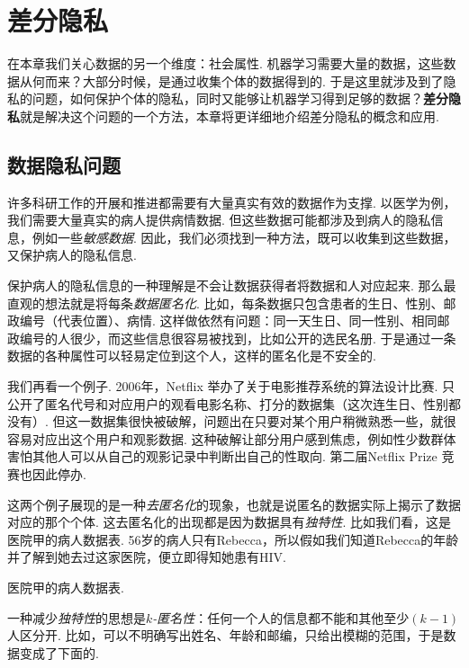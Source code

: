 \chapter{差分隐私}\label{chap:differential-privacy}

在本章我们关心数据的另一个维度：社会属性. 机器学习需要大量的数据，这些数据从何而来？大部分时候，是通过收集个体的数据得到的. 于是这里就涉及到了隐私的问题，如何保护个体的隐私，同时又能够让机器学习得到足够的数据？\textbf{差分隐私}就是解决这个问题的一个方法，本章将更详细地介绍差分隐私的概念和应用. 

\section{数据隐私问题}

许多科研工作的开展和推进都需要有大量真实有效的数据作为支撑. 以医学为例，我们需要大量真实的病人提供病情数据. 但这些数据可能都涉及到病人的隐私信息，例如一些\emph{敏感数据}. 因此，我们必须找到一种方法，既可以收集到这些数据，又保护病人的隐私信息.

保护病人的隐私信息的一种理解是不会让数据获得者将数据和人对应起来. 那么最直观的想法就是将每条\emph{数据匿名化}. 比如，每条数据只包含患者的生日、性别、邮政编号（代表位置）、病情. 这样做依然有问题：同一天生日、同一性别、相同邮政编号的人很少，而这些信息很容易被找到，比如公开的选民名册. 于是通过一条数据的各种属性可以轻易定位到这个人，这样的匿名化是不安全的.

我们再看一个例子. 2006年，Netflix 举办了关于电影推荐系统的算法设计比赛.
只公开了匿名代号和对应用户的观看电影名称、打分的数据集（这次连生日、性别都没有）. 但这一数据集很快被破解，问题出在只要对某个用户稍微熟悉一些，就很容易对应出这个用户和观影数据. 这种破解让部分用户感到焦虑，例如性少数群体害怕其他人可以从自己的观影记录中判断出自己的性取向. 第二届Netflix Prize 竞赛也因此停办.

这两个例子展现的是一种\emph{去匿名化}的现象，也就是说匿名的数据实际上揭示了数据对应的那个个体. 这去匿名化的出现都是因为数据具有\emph{独特性}. 比如我们看，这是医院甲的病人数据表. 56岁的病人只有Rebecca，所以假如我们知道Rebecca的年龄并了解到她去过这家医院，便立即得知她患有HIV.

\begin{table}[!ht]
\centering

\caption{医院甲的病人数据表. }
\label{tab:tab01}
\end{table}

一种减少\emph{独特性}的思想是\emph{$k$-匿名性}：任何一个人的信息都不能和其他至少$(k-1)$人区分开. 比如，可以不明确写出姓名、年龄和邮编，只给出模糊的范围，于是数据变成了下面的.

